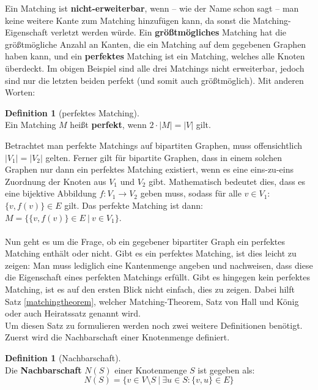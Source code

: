 \documentclass[a4paper]{scrreprt}
\theoremstyle{plain} %
\theoremstyle{definition} %
\newtheorem{definition}[theorem]{Definition}
\begin{document}
\noindent
Ein Matching ist \textbf{nicht-erweiterbar}, wenn -- wie der Name schon sagt -- man keine weitere
Kante zum Matching hinzufügen kann, da sonst die Matching-Eigenschaft verletzt werden würde.
Ein \textbf{größtmögliches} Matching hat die größtmögliche Anzahl an Kanten, die ein Matching auf dem gegebenen Graphen haben
kann, und ein \textbf{perfektes} Matching ist ein Matching, welches alle Knoten überdeckt.
Im obigen Beispiel sind alle drei Matchings nicht erweiterbar, jedoch sind nur die letzten beiden 
perfekt (und somit auch größtmöglich). Mit anderen Worten:

\begin{definition}[perfektes Matching] ~\\
Ein Matching $M$ heißt \textbf{perfekt}, wenn $2\cdot |M| = |V|$ gilt.
\end{definition}


\noindent 
Betrachtet man perfekte Matchings auf bipartiten Graphen, muss offensichtlich $|V_1| = |V_2|$ gelten. 
Ferner gilt für bipartite Graphen, dass in einem solchen Graphen nur dann ein perfektes Matching existiert, 
wenn es eine eins-zu-eins Zuordnung der Knoten aus $V_1$ und $V_2$ gibt. Mathematisch bedeutet dies,
dass es eine bijektive Abbildung $f: V_1 \rightarrow V_2$ geben muss, sodass für alle $v \in V_1$:  
$\{v,f(v)\} \in E$ gilt. Das perfekte Matching ist dann: $M=\{\{v,f(v)\} \in E ~ | ~ v\in V_1\}$.
\\
\\
Nun geht es um die Frage, ob ein gegebener bipartiter Graph ein perfektes Matching enthält oder
nicht. Gibt es ein perfektes Matching, ist dies leicht zu zeigen: Man muss lediglich eine Kantenmenge
angeben und nachweisen, dass diese die Eigenschaft eines perfekten Matchings erfüllt. Gibt es hingegen kein
perfektes Matching, ist es auf den ersten Blick nicht einfach, dies zu zeigen. Dabei hilft Satz \ref{matchingtheorem},
welcher Matching-Theorem, Satz von Hall und König oder auch Heiratssatz \cite{heirat} genannt wird.
\\
Um diesen Satz zu formulieren werden noch zwei weitere Definitionen benötigt. Zuerst wird die Nachbarschaft
einer Knotenmenge definiert.

\begin{definition}[Nachbarschaft] ~\\
Die \textbf{Nachbarschaft} $N(S)$ einer Knotenmenge $S$ ist gegeben als:
\[N(S) = \Big\{ v \in V \setminus S \ | \ \exists u \in S : \{v,u\}\in E  \Big\}\]
\end{definition}
\end{document}
